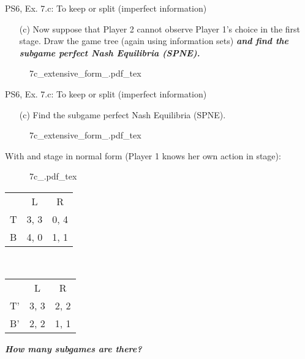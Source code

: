 \begin{frame}{PS6, Ex. 7.c: To keep or split (imperfect information)}
    \begin{itemize}
      \item[(c)] Now suppose that Player 2 cannot observe Player 1’s choice in the first stage. Draw the game tree (again using information sets) \textbf{\textit{and find the subgame perfect Nash Equilibria (SPNE).}}
    \end{itemize}
    \begin{figure}[!h]
      \center
      \def\svgwidth{.8\columnwidth}
      {7c_extensive_form_.pdf_tex}
    \end{figure}
    \vfill\null
\end{frame}
\begin{frame}{PS6, Ex. 7.c: To keep or split (imperfect information)}
    \begin{itemize}
      \item[(c)] Find the subgame perfect Nash Equilibria (SPNE).
    \end{itemize}
    \vspace{-4pt}
    \begin{figure}[!h]
      \center
      \def\svgwidth{.8\columnwidth}
      {7c_extensive_form_.pdf_tex}
    \end{figure}
    \vspace{-4pt}
    With  and  stage in normal form (Player 1 knows her own action in  stage):
    \vspace{-4pt}
    \begin{multicols}{2}
      \begin{figure}[!h]
        \center
        \def\svgwidth{.5\columnwidth}
        {7c_.pdf_tex}
      \end{figure}
      \vspace{-9pt}
      \begin{table}
        \begin{tabular}{l|c|c|}
          \multicolumn{1}{c}{} & \multicolumn{1}{c}{L} & \multicolumn{1}{c}{R} \\\cline{2-3}
          T & 3, 3 & 0, 4 \\\cline{2-3}
          B & 4, 0 & 1, 1 \\\cline{2-3}
        \end{tabular}\
        \begin{tabular}{l|c|c|}
          \multicolumn{1}{c}{} & \multicolumn{1}{c}{L} & \multicolumn{1}{c}{R} \\\cline{2-3}
          T' & 3, 3 & 2, 2 \\\cline{2-3}
          B' & 2, 2 & 1, 1 \\\cline{2-3}
        \end{tabular}
      \end{table}
    \vfill\null \columnbreak
    \vfill\null
    \textbf{\textit{How many subgames are there?}}
  \end{multicols}
\end{frame}
